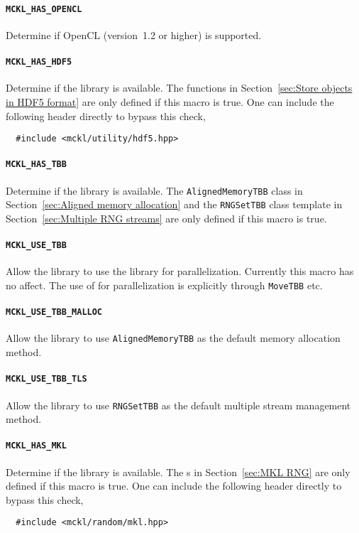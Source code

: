 \paragraph{\texttt{MCKL\_HAS\_OPENCL}} Determine if OpenCL (version~1.2 or
higher) is supported.

\paragraph{\texttt{MCKL\_HAS\_HDF5}} Determine if the \hdf library is
available. The functions in Section~\ref{sec:Store objects in HDF5 format} are
only defined if this macro is true. One can include the following header
directly to bypass this check,
\begin{Verbatim}
  #include <mckl/utility/hdf5.hpp>
\end{Verbatim}

\paragraph{\texttt{MCKL\_HAS\_TBB}} Determine if the \tbb library is available.
The \verb|AlignedMemoryTBB| class in Section~\ref{sec:Aligned memory
  allocation} and the \verb|RNGSetTBB| class template in
Section~\ref{sec:Multiple RNG streams} are only defined if this macro is true.

\paragraph{\texttt{MCKL\_USE\_TBB}} Allow the library to use the \tbb library
for parallelization. Currently this macro has no affect. The use of \tbb for
parallelization is explicitly through \verb|MoveTBB| etc.

\paragraph{\texttt{MCKL\_USE\_TBB\_MALLOC}} Allow the library to use
\verb|AlignedMemoryTBB| as the default memory allocation method.

\paragraph{\texttt{MCKL\_USE\_TBB\_TLS}} Allow the library to use
\verb|RNGSetTBB| as the default multiple \rng stream management method.

\paragraph{\texttt{MCKL\_HAS\_MKL}} Determine if the \mkl library is available.
The \rng{}s in Section~\ref{sec:MKL RNG} are only defined if this macro is
true. One can include the following header directly to bypass this check,
\begin{Verbatim}
  #include <mckl/random/mkl.hpp>
\end{Verbatim}


